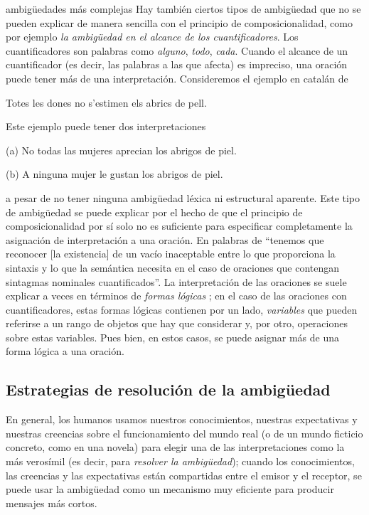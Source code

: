 \begin{persabermes}{ambigüedades más complejas} Hay también ciertos tipos de ambigüedad que no se pueden explicar de manera sencilla con el principio de composicionalidad, como por ejemplo {\em la ambigüedad en el alcance de los cuantificadores}. Los cuantificadores son palabras como \emph{alguno}, \emph{todo}, \emph{cada}. Cuando el alcance de un cuantificador (es decir, las palabras a las que afecta) es impreciso, una oración puede tener más de una interpretación. Consideremos el ejemplo en catalán de \cite{hutchins92b} \begin{exemple} Totes les dones no s'estimen els abrics de pell. \label{eq:abric} \end{exemple} Este ejemplo puede tener dos interpretaciones \begin{exemple} \item[(a)] No todas las mujeres aprecian los abrigos de piel. \item[(b)] A ninguna mujer le gustan los abrigos de piel. \end{exemple} a pesar de no tener ninguna ambigüedad léxica ni estructural aparente. Este tipo de ambigüedad se puede explicar por el hecho de que el principio de composicionalidad por sí solo no es suficiente para especificar completamente la asignación de interpretación a una oración. En palabras de \citet[p.364]{radford99b} ``tenemos que reconocer [la existencia] de un vacío inaceptable entre lo que proporciona la sintaxis y lo que la semántica necesita en el caso de oraciones que contengan sintagmas nominales cuantificados''. La interpretación de las oraciones se suele explicar a veces en términos de {\em formas lógicas} \citep[cap.23]{radford09b}; en el caso de las oraciones con cuantificadores, estas formas lógicas contienen por un lado, \emph{variables} que pueden referirse a un rango de objetos que hay que considerar y, por otro, operaciones sobre estas variables. Pues bien, en estos casos, se puede asignar más de una forma lógica a una oración. 

\mbox{} 

\end{persabermes} 

\subsection{Estrategias de resolución de la ambigüedad} En general, los humanos usamos nuestros conocimientos, nuestras expectativas y nuestras creencias sobre el funcionamiento del mundo real (o de un mundo ficticio concreto, como en una novela) para elegir una de las interpretaciones como la más verosímil (es decir, para \emph{resolver la ambigüedad}); cuando los conocimientos, las creencias y las expectativas están compartidas entre el emisor y el receptor, se puede usar la ambigüedad como un mecanismo muy eficiente para producir mensajes más cortos. 

